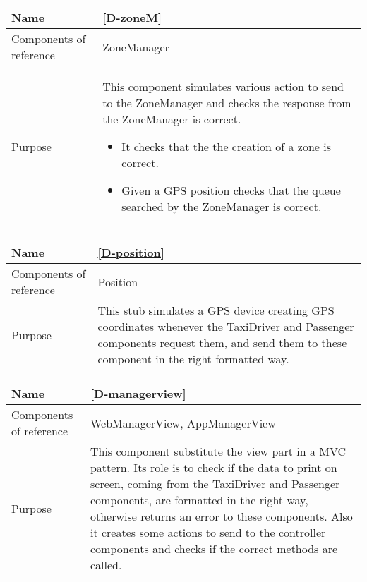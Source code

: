 \begin{table}[H]
    \begin{tabularx}{\textwidth}{l|X}
        \hline
        Name
        & 
        \ref{D-zoneM}
        \\ \hline
        Components of reference 
        & 
        ZoneManager
        \\ \hline
        Purpose
        & 
        This component simulates various action to send to the ZoneManager and checks the response from the ZoneManager is correct.
        \begin{itemize}
            \item  It checks that the the creation of a zone is correct.
            \item Given a GPS position checks that the queue searched by the ZoneManager is correct.
        \end{itemize}
        \\ \hline
    \end{tabularx}
\end{table}

\begin{table}[H]
    \begin{tabularx}{\textwidth}{l|X}
        \hline
        Name
        & 
        \ref{D-position}
        \\ \hline
        Components of reference 
        & 
        Position
        \\ \hline
        Purpose
        & 
        This stub simulates a GPS device creating GPS coordinates whenever the TaxiDriver and Passenger components request them, and send them to these component in the right formatted way.
        \\ \hline
    \end{tabularx}
\end{table}


\begin{table}[H]
    \begin{tabularx}{\textwidth}{l|X}
        \hline
        Name
        & 
        \ref{D-managerview}
        \\ \hline
        Components of reference 
        & 
        WebManagerView, AppManagerView
        \\ \hline
        Purpose
        & 
        This component substitute the view part in a MVC pattern. Its role is to check if the data to print on screen, coming from the TaxiDriver and Passenger components, are formatted in the right way, otherwise returns an error to these components.
        Also it creates some actions to send to the controller components and checks if the correct methods are called.
        \\ \hline
    \end{tabularx}
\end{table}
